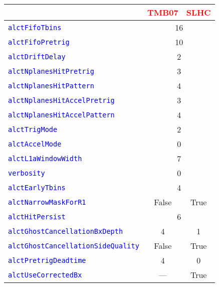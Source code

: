 \begin{center}
\begin{tabular}{|l|c|c|}
\hline
  & \textcolor{red}{TMB07} & \textcolor{red}{SLHC} \\
\hline
\hline
\textcolor{blue}{\texttt{alctFifoTbins}} & \multicolumn{2}{c|}{16} \\
\hline
\textcolor{blue}{\texttt{alctFifoPretrig}} & \multicolumn{2}{c|}{10} \\
\hline
\textcolor{blue}{\texttt{alctDriftDelay}} & \multicolumn{2}{c|}{2} \\
\hline
\textcolor{blue}{\texttt{alctNplanesHitPretrig}} & \multicolumn{2}{c|}{3} \\
\hline
\textcolor{blue}{\texttt{alctNplanesHitPattern}} & \multicolumn{2}{c|}{4} \\
\hline
\textcolor{blue}{\texttt{alctNplanesHitAccelPretrig}} & \multicolumn{2}{c|}{3} \\
\hline
\textcolor{blue}{\texttt{alctNplanesHitAccelPattern}} & \multicolumn{2}{c|}{4} \\
\hline
\textcolor{blue}{\texttt{alctTrigMode}} & \multicolumn{2}{c|}{2} \\
\hline
\textcolor{blue}{\texttt{alctAccelMode}} & \multicolumn{2}{c|}{0} \\
\hline
\textcolor{blue}{\texttt{alctL1aWindowWidth}} & \multicolumn{2}{c|}{7} \\
\hline
\textcolor{blue}{\texttt{verbosity}} & \multicolumn{2}{c|}{0} \\
\hline
\textcolor{blue}{\texttt{alctEarlyTbins}} & \multicolumn{2}{c|}{4} \\
\hline
\textcolor{blue}{\texttt{alctNarrowMaskForR1}} & False & True \\
\hline
\textcolor{blue}{\texttt{alctHitPersist}} & \multicolumn{2}{c|}{6} \\
\hline
\textcolor{blue}{\texttt{alctGhostCancellationBxDepth}}  & 4 & 1 \\
\hline
\textcolor{blue}{\texttt{alctGhostCancellationSideQuality}} & False & True \\
\hline
\textcolor{blue}{\texttt{alctPretrigDeadtime}} & 4 & 0 \\
\hline
\textcolor{blue}{\texttt{alctUseCorrectedBx}} & --- & True \\
\hline
\end{tabular}
\end{center}


